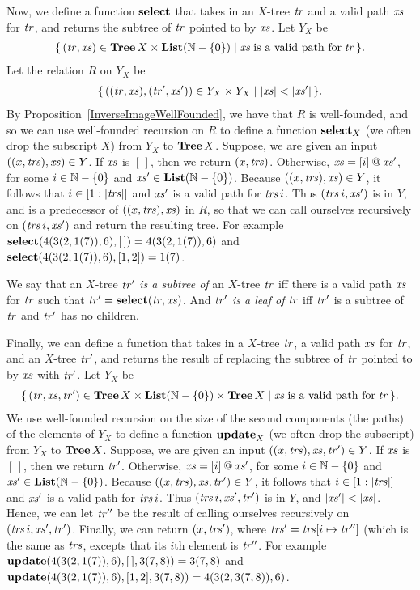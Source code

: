 Now, we define a function $\mathbf{select}$ that takes in an $X$-tree ${\it tr}$ and
a valid path ${\it xs}$ for ${\it tr}$, and returns the subtree of
${\it tr}$ pointed to by ${\it xs}$.
Let $Y_X$ be
\begin{gather*}
\setof{(\tr,\xs)\in\Tree\,X\times\List(\nats-\{0\})}%
{\xs\eqtxt{is a valid path for}\tr} .
\end{gather*}
Let the relation
$R$ on $Y_X$ be
\begin{gather*}
\setof{((\tr,\xs),(\tr',\xs'))\in Y_X\times Y_X}{|\xs|<|\xs'|} .
\end{gather*}
By Proposition~\ref{InverseImageWellFounded}, we have that $R$ is
well-founded, and so we can use well-founded recursion on $R$ to
define a function $\mathbf{select}_X$ (we often drop the subscript $X$) from
$Y_X$ to $\mathbf{Tree}\,X$.  Suppose, we are given an input $((x,{\it trs}),{\it xs})\in
Y$.  If ${\it xs}$ is $[\,]$, then we return $(x,{\it trs})$.  Otherwise,
${\it xs}=[i]\mathbin{@}{\it xs}'$, for some $i\in\mathbb{N}-\{0\}$ and
${\it xs}'\in\mathbf{List}(\mathbb{N}-\{0\})$.  Because $((x,{\it trs}),{\it xs})\in Y$, it
follows that $i\in[1:|{\it trs}|]$ and ${\it xs}'$ is a valid path for
${\it trs}\,i$.  Thus $({\it trs}\,i, {\it xs}')$ is in $Y$, and is a predecessor of
$((x,{\it trs}),{\it xs})$ in $R$, so that we can call ourselves recursively on
$({\it trs}\,i, {\it xs}')$ and return the resulting tree.  For example
$\mathbf{select}(4(3(2,1(7)),6), [\,]) = 4(3(2,1(7)),6)$ and
$\mathbf{select}(4(3(2,1(7)),6),[1,2]) = 1(7)$.

We say that an $X$-tree ${\it tr}'$ \emph{is a subtree of} an $X$-tree
${\it tr}$ iff there is a valid path ${\it xs}$ for ${\it tr}$ such that
${\it tr}'=\mathbf{select}({\it tr},{\it xs})$.  And ${\it tr}'$ \emph{is a leaf of} ${\it tr}$
iff ${\it tr}'$ is a subtree of ${\it tr}$ and ${\it tr}'$ has no children.

Finally, we can define a function that takes in a $X$-tree ${\it tr}$,
a valid path ${\it xs}$ for ${\it tr}$, and an $X$-tree ${\it tr}'$, and
returns the result of replacing the subtree of ${\it tr}$ pointed
to by ${\it xs}$ with ${\it tr}'$.
Let $Y_X$ be
\begin{gather*}
\setof{(\tr,\xs,\tr')
\in\Tree\,X\times\List(\nats-\{0\})\times\Tree\,X}%
{\xs\eqtxt{is a valid path for}\tr} .
\end{gather*}
We use well-founded recursion on the size of the second components
(the paths) of the elements of $Y_X$ to define a function $\mathbf{update}_X$
(we often drop the subscript) from $Y_X$ to $\mathbf{Tree}\,X$.
Suppose, we are given an input $((x,{\it trs}),{\it xs},{\it tr}')\in Y$.  If
${\it xs}$ is $[\,]$, then we return ${\it tr}'$.  Otherwise,
${\it xs}=[i]\mathbin{@}{\it xs}'$, for some $i\in\mathbb{N}-\{0\}$ and
${\it xs}'\in\mathbf{List}(\mathbb{N}-\{0\})$.  Because $((x,{\it trs}),{\it xs},{\it tr}')\in Y$,
it follows that $i\in[1:|{\it trs}|]$ and ${\it xs}'$ is a valid path
for ${\it trs}\,i$.  Thus $({\it trs}\,i, {\it xs}', {\it tr}')$ is in $Y$, and
$|\xs'|<|\xs|$.  Hence, we can let ${\it tr}''$ be the result of
calling ourselves recursively on $({\it trs}\,i, {\it xs}', {\it tr}')$.
Finally, we can return $(x,{\it trs}')$, where ${\it trs}'=
{\it trs}[i\mapsto{\it tr}'']$ (which is the same as ${\it trs}$, excepts that
its $i$th element is ${\it tr}''$.
For example $\mathbf{update}(4(3(2,1(7)),6), [\,], 3(7,8)) = 3(7,8)$ and
$\mathbf{update}(4(3(2,1(7)),6), [1,2], 3(7,8)) =
4(3(2,3(7,8)),6)$.

